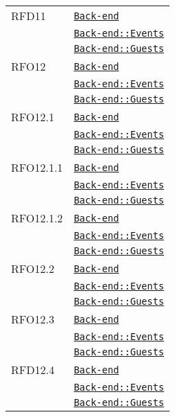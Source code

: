 \begin{longtable}{|>{\centering}m{3cm}|m{10cm}<{\centering}|}
RFD11 & \hyperref[Back-end]{\texttt{Back-end}}\\
& \hyperref[Back-end::Events]{\texttt{Back-end::Events}}\\
& \hyperref[Back-end::Guests]{\texttt{Back-end::Guests}}\\ \hline

RFO12 & \hyperref[Back-end]{\texttt{Back-end}}\\
& \hyperref[Back-end::Events]{\texttt{Back-end::Events}}\\
& \hyperref[Back-end::Guests]{\texttt{Back-end::Guests}}\\ \hline

RFO12.1 & \hyperref[Back-end]{\texttt{Back-end}}\\
& \hyperref[Back-end::Events]{\texttt{Back-end::Events}}\\
& \hyperref[Back-end::Guests]{\texttt{Back-end::Guests}}\\ \hline

RFO12.1.1 & \hyperref[Back-end]{\texttt{Back-end}}\\
& \hyperref[Back-end::Events]{\texttt{Back-end::Events}}\\
& \hyperref[Back-end::Guests]{\texttt{Back-end::Guests}}\\ \hline

RFO12.1.2 & \hyperref[Back-end]{\texttt{Back-end}}\\
& \hyperref[Back-end::Events]{\texttt{Back-end::Events}}\\
& \hyperref[Back-end::Guests]{\texttt{Back-end::Guests}}\\ \hline

RFO12.2 & \hyperref[Back-end]{\texttt{Back-end}}\\
& \hyperref[Back-end::Events]{\texttt{Back-end::Events}}\\
& \hyperref[Back-end::Guests]{\texttt{Back-end::Guests}}\\ \hline

RFO12.3 & \hyperref[Back-end]{\texttt{Back-end}}\\
& \hyperref[Back-end::Events]{\texttt{Back-end::Events}}\\
& \hyperref[Back-end::Guests]{\texttt{Back-end::Guests}}\\ \hline

RFD12.4 & \hyperref[Back-end]{\texttt{Back-end}}\\
& \hyperref[Back-end::Events]{\texttt{Back-end::Events}}\\
& \hyperref[Back-end::Guests]{\texttt{Back-end::Guests}}\\ \hline


\end{longtable}
